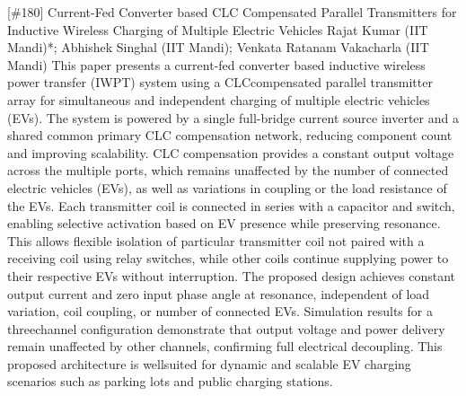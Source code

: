 {} \begin{abstract_online} {[\#180] Current-Fed Converter based CLC Compensated Parallel Transmitters for Inductive Wireless Charging of Multiple Electric Vehicles} {} {Rajat Kumar (IIT Mandi)*; Abhishek Singhal (IIT Mandi); Venkata Ratanam  Vakacharla (IIT Mandi)} {} This paper presents a current-fed converter based inductive wireless power transfer (IWPT) system using a CLCcompensated parallel transmitter array for simultaneous and independent charging of multiple electric vehicles (EVs). The system is powered by a single full-bridge current source inverter and a shared common primary CLC compensation network, reducing component count and improving scalability. CLC compensation provides a constant output voltage across the multiple ports, which remains unaffected by the number of connected electric vehicles (EVs), as well as variations in coupling or the load resistance of the EVs. Each transmitter coil is connected in series with a capacitor and switch, enabling selective activation based on EV presence while preserving resonance. This allows flexible isolation of particular transmitter coil not paired with a receiving coil using relay switches, while other coils continue supplying power to their respective EVs without interruption. The proposed design achieves constant output current and zero input phase angle at resonance, independent of load variation, coil coupling, or number of connected EVs. Simulation results for a threechannel configuration demonstrate that output voltage and power delivery remain unaffected by other channels, confirming full electrical decoupling. This proposed architecture is wellsuited for dynamic and scalable EV charging scenarios such as parking lots and public charging stations.  \end{abstract_online} 
